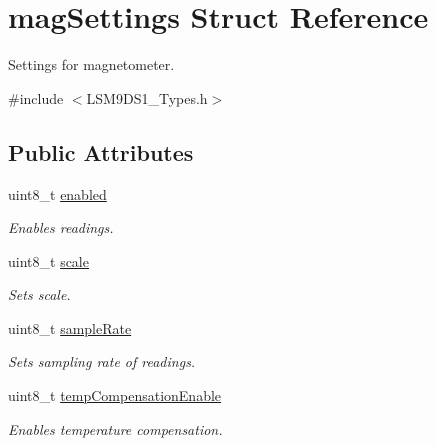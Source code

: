 \hypertarget{structmagSettings}{}\section{mag\+Settings Struct Reference}
\label{structmagSettings}


Settings for magnetometer.  




{\ttfamily \#include $<$L\+S\+M9\+D\+S1\+\_\+\+Types.\+h$>$}

\subsection*{Public Attributes}
\begin{DoxyCompactItemize}
\item 
\mbox{\label{structmagSettings_a97f8e5c4baf3fc9a662f84fedb188f3c}} 
uint8\+\_\+t \hyperlink{structmagSettings_a97f8e5c4baf3fc9a662f84fedb188f3c}{enabled}
\begin{DoxyCompactList}\small\item\em Enables readings. \end{DoxyCompactList}\item 
\mbox{\label{structmagSettings_a5966915104376cb76d9eb787bab024bc}} 
uint8\+\_\+t \hyperlink{structmagSettings_a5966915104376cb76d9eb787bab024bc}{scale}
\begin{DoxyCompactList}\small\item\em Sets scale. \end{DoxyCompactList}\item 
\mbox{\label{structmagSettings_aca3dbf81e533dce344e618a3df199c1e}} 
uint8\+\_\+t \hyperlink{structmagSettings_aca3dbf81e533dce344e618a3df199c1e}{sample\+Rate}
\begin{DoxyCompactList}\small\item\em Sets sampling rate of readings. \end{DoxyCompactList}\item 
\mbox{\label{structmagSettings_afcfa1e532fa140e42dc34a4abd7926ae}} 
uint8\+\_\+t \hyperlink{structmagSettings_afcfa1e532fa140e42dc34a4abd7926ae}{temp\+Compensation\+Enable}
\begin{DoxyCompactList}\small\item\em Enables temperature compensation. \end{DoxyCompactList}\item 

\end{DoxyCompactItemize}

